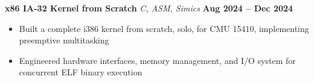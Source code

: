 \documentclass[fontsize=12pt]{scrartcl}
\begin{document}
\textbf{x86 IA-32 Kernel from Scratch} {\small\textit{C, ASM, Simics}} \hfill \textbf{Aug 2024 -- Dec 2024}
\begin{itemize}
    \item Built a complete i386 kernel from scratch, solo, for CMU 15410, implementing preemptive multitasking
    \item Engineered hardware interfaces, memory management, and I/O system for concurrent ELF binary execution
\end{itemize}
\end{document}
